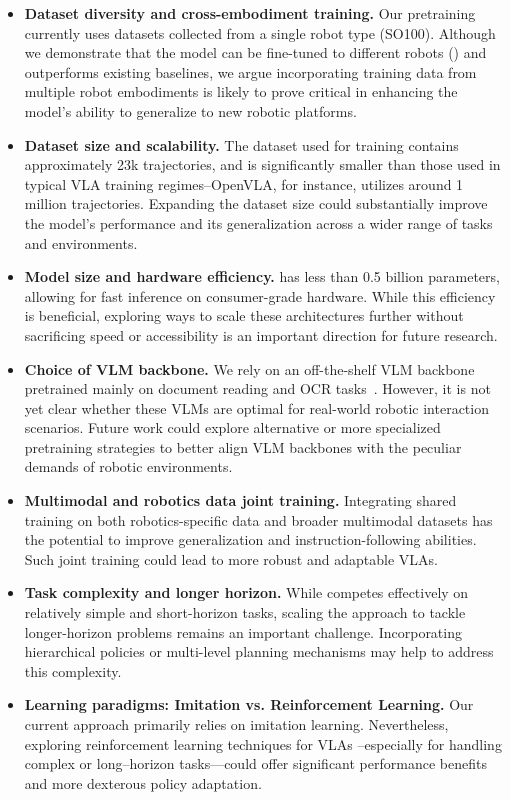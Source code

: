 \begin{itemize}
    \item{\textbf{Dataset diversity and cross-embodiment training.}} Our pretraining currently uses datasets collected from a single robot type (SO100). Although we demonstrate that the model can be fine-tuned to different robots () and outperforms existing baselines, we argue incorporating training data from multiple robot embodiments is likely to prove critical in enhancing the model’s ability to generalize to new robotic platforms.
    \item{\textbf{Dataset size and scalability.}} The dataset used for training contains approximately 23k trajectories, and is significantly smaller than those used in typical VLA training regimes--OpenVLA, for instance, utilizes around 1 million trajectories. Expanding the dataset size could substantially improve the model’s performance and its generalization across a wider range of tasks and environments.
    \item{\textbf{Model size and hardware efficiency.}}
    \ours has less than 0.5 billion parameters, allowing for fast inference on consumer-grade hardware. While this efficiency is beneficial, exploring ways to scale these architectures further without sacrificing speed or accessibility is an important direction for future research. 
    \item{\textbf{Choice of VLM backbone.}} We rely on an off-the-shelf VLM backbone pretrained mainly on document reading and OCR tasks~\citep{marafioti2025smolvlm}. However, it is not yet clear whether these VLMs are optimal for real-world robotic interaction scenarios. Future work could explore alternative or more specialized pretraining strategies to better align VLM backbones with the peculiar demands of robotic environments.
    \item{\textbf{Multimodal and robotics data joint training.}}
    Integrating shared training on both robotics-specific data and broader multimodal datasets has the potential to improve generalization and instruction-following abilities. Such joint training could lead to more robust and adaptable VLAs.
    \item{\textbf{Task complexity and longer horizon.}}
    While \ours competes effectively on relatively simple and short-horizon tasks, scaling the approach to tackle longer-horizon problems remains an important challenge. Incorporating hierarchical policies or multi-level planning mechanisms may help to address this complexity.
    \item{\textbf{Learning paradigms: Imitation vs. Reinforcement Learning.}} Our current approach primarily relies on imitation learning. Nevertheless, exploring reinforcement learning techniques for VLAs \citep{chen2025conrft}--especially for handling complex or long--horizon tasks—could offer significant performance benefits and more dexterous policy adaptation.
\end{itemize}

